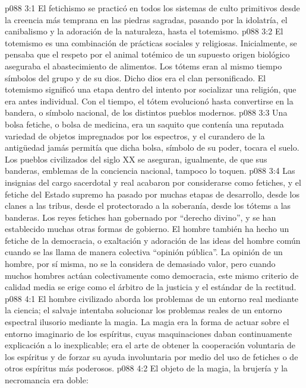 \vs p088 3:1 El fetichismo se practicó en todos los sistemas de culto primitivos desde la creencia más temprana en las piedras sagradas, pasando por la idolatría, el canibalismo y la adoración de la naturaleza, hasta el totemismo.
\vs p088 3:2 El totemismo es una combinación de prácticas sociales y religiosas. Inicialmente, se pensaba que el respeto por el animal totémico de un supuesto origen biológico aseguraba el abastecimiento de alimentos. Los tótems eran al mismo tiempo símbolos del grupo y de su dios. Dicho dios era el clan personificado. El totemismo significó una etapa dentro del intento por socializar una religión, que era antes individual. Con el tiempo, el tótem evolucionó hasta convertirse en la bandera, o símbolo nacional, de los distintos pueblos modernos.
\vs p088 3:3 Una bolsa fetiche, o bolsa de medicina, era un saquito que contenía una reputada variedad de objetos impregnados por los espectros, y el curandero de la antigüedad jamás permitía que dicha bolsa, símbolo de su poder, tocara el suelo. Los pueblos civilizados del siglo XX se aseguran, igualmente, de que sus banderas, emblemas de la conciencia nacional, tampoco lo toquen.
\vs p088 3:4 Las insignias del cargo sacerdotal y real acabaron por considerarse como fetiches, y el fetiche del Estado supremo ha pasado por muchas etapas de desarrollo, desde los clanes a las tribus, desde el protectorado a la soberanía, desde los tótems a las banderas. Los reyes fetiches han gobernado por “derecho divino”, y se han establecido muchas otras formas de gobierno. El hombre también ha hecho un fetiche de la democracia, o exaltación y adoración de las ideas del hombre común cuando se las llama de manera colectiva “opinión pública”. La opinión de un hombre, por sí misma, no se la considera de demasiado valor, pero cuando muchos hombres actúan colectivamente como democracia, este mismo criterio de calidad media se erige como el árbitro de la justicia y el estándar de la rectitud.
\vs p088 4:1 El hombre civilizado aborda los problemas de un entorno real mediante la ciencia; el salvaje intentaba solucionar los problemas reales de un entorno espectral ilusorio mediante la magia. La magia era la forma de actuar sobre el entorno imaginario de los espíritus, cuyas maquinaciones daban continuamente explicación a lo inexplicable; era el arte de obtener la cooperación voluntaria de los espíritus y de forzar su ayuda involuntaria por medio del uso de fetiches o de otros espíritus más poderosos.
\vs p088 4:2 El objeto de la magia, la brujería y la necromancia era doble:
